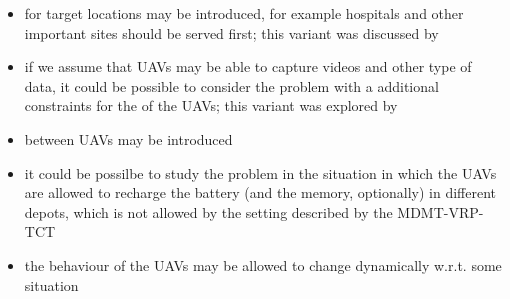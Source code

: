 \documentclass[a4paper, 12pt]{report}
\begin{document}
    \begin{itemize}
        \item {} for target locations may be introduced, for example hospitals and other important sites should be served first; this variant was discussed by \textcite{calamoneri2}
        \item if we assume that UAVs may be able to capture videos and other type of data, it could be possible to consider the problem with a additional constraints for the  of the UAVs; this variant was explored by \textcite{sorbelli}
        \item {} between UAVs may be introduced
        \item it could be possilbe to study the problem in the situation in which the UAVs are allowed to recharge the battery (and the memory, optionally) in different depots, which is not allowed by the setting described by the MDMT-VRP-TCT
        \item the behaviour of the UAVs may be allowed to change dynamically w.r.t. some  situation
    \end{itemize}

    \printbibliography
\end{document}
